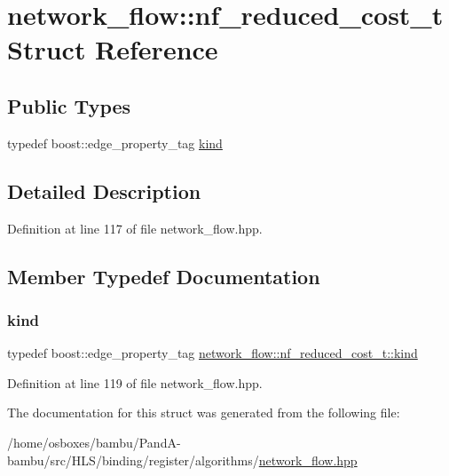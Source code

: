 \hypertarget{structnetwork__flow_1_1nf__reduced__cost__t}{}\section{network\+\_\+flow\+:\+:nf\+\_\+reduced\+\_\+cost\+\_\+t Struct Reference}
\label{structnetwork__flow_1_1nf__reduced__cost__t}
\subsection*{Public Types}
\begin{DoxyCompactItemize}
\item 
typedef boost\+::edge\+\_\+property\+\_\+tag \hyperlink{structnetwork__flow_1_1nf__reduced__cost__t_ac8f714013753b50eeb73a65f2fc210e9}{kind}
\end{DoxyCompactItemize}


\subsection{Detailed Description}


Definition at line 117 of file network\+\_\+flow.\+hpp.



\subsection{Member Typedef Documentation}
\mbox{\label{structnetwork__flow_1_1nf__reduced__cost__t_ac8f714013753b50eeb73a65f2fc210e9}} 
\subsubsection{\texorpdfstring{kind}{kind}}
{\footnotesize\ttfamily typedef boost\+::edge\+\_\+property\+\_\+tag \hyperlink{structnetwork__flow_1_1nf__reduced__cost__t_ac8f714013753b50eeb73a65f2fc210e9}{network\+\_\+flow\+::nf\+\_\+reduced\+\_\+cost\+\_\+t\+::kind}}



Definition at line 119 of file network\+\_\+flow.\+hpp.



The documentation for this struct was generated from the following file\+:\begin{DoxyCompactItemize}
\item 
/home/osboxes/bambu/\+Pand\+A-\/bambu/src/\+H\+L\+S/binding/register/algorithms/\hyperlink{network__flow_8hpp}{network\+\_\+flow.\+hpp}\end{DoxyCompactItemize}
